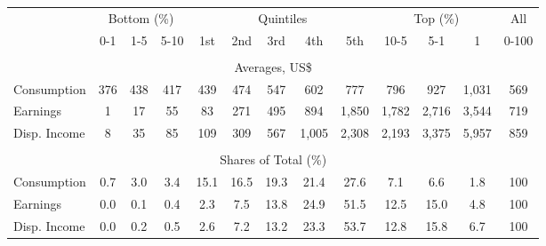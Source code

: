 \begin{tabular}{l c c c| c c c c c| c c c| c}
\toprule
&\multicolumn{3}{c|}{Bottom (\%)} & \multicolumn{5}{c|}{Quintiles} & \multicolumn{3}{c|}{Top (\%)} & All  \\
& 0-1 & 1-5 & 5-10 &  1st & 2nd & 3rd & 4th & 5th & 10-5 & 5-1 & 1 & 0-100 \\
\midrule \\
\multicolumn{13}{c}{Averages, US\$} \\
\midrule
Consumption  & 376  & 438  & 417  & 439  & 474  & 547  & 602  & 777  & 796  & 927  & 1,031  & 569 \\
Earnings         & 1 & 17 & 55 & 83 & 271 & 495 & 894 & 1,850 & 1,782 & 2,716 & 3,544 & 719 \\
Disp. Income & 8 & 35 & 85 & 109 & 309 & 567 & 1,005 & 2,308 & 2,193 & 3,375 & 5,957 & 859 \\
\midrule \\
\multicolumn{13}{c}{Shares of Total (\%)} \\
\midrule
Consumption  & 0.7   & 3.0   & 3.4   & 15.1   & 16.5   & 19.3   & 21.4   & 27.6   & 7.1   & 6.6   & 1.8   & 100 \\
Earnings         & 0.0  & 0.1  & 0.4  & 2.3  & 7.5  & 13.8  & 24.9  & 51.5  & 12.5  & 15.0  & 4.8  & 100 \\
Disp. Income & 0.0  & 0.2  & 0.5  & 2.6  & 7.2  & 13.2  & 23.3  & 53.7  & 12.8  & 15.8  & 6.7  & 100 \\
\bottomrule
\end{tabular}